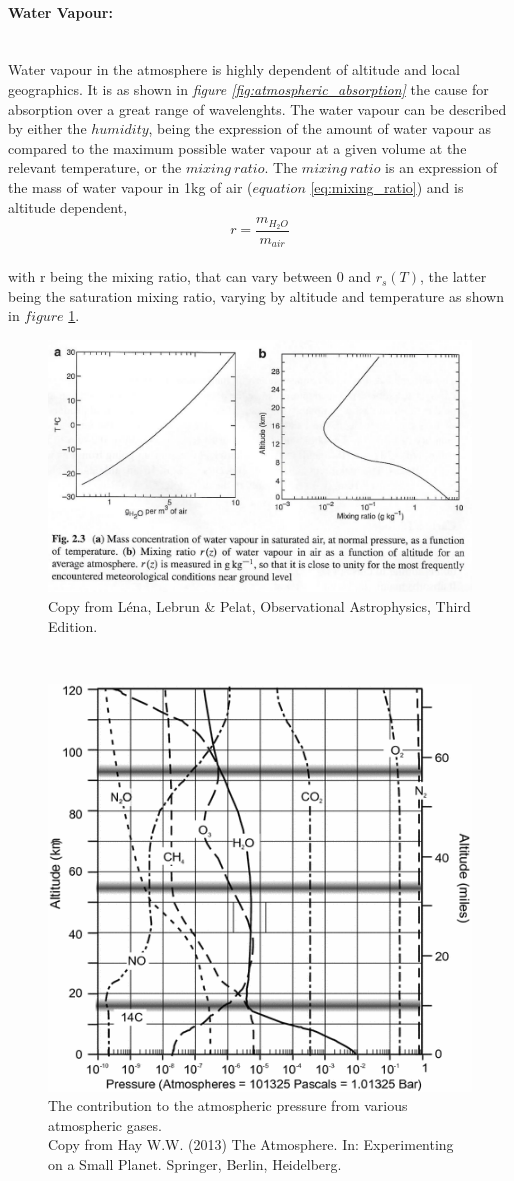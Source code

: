 \documentclass[a4paper, 12pt, twoside]{article}
\begin{document}
\paragraph[Water Vapour:]{Water Vapour:}\mbox{}\\
Water vapour in the atmosphere is highly dependent of altitude and local geographics. It is as shown in \emph{figure \ref{fig:atmospheric_absorption}} the cause for absorption over a great range of wavelenghts. The water vapour can be described by either the $humidity$, being the expression of the amount of water vapour as compared to the maximum possible water vapour at a given volume at the relevant temperature, or the $mixing\ ratio$. The $mixing\ ratio$ is an expression of the mass of water vapour in 1kg of air ($equation$ \ref{eq:mixing_ratio}) and is altitude dependent, 
\begin{equation}
r = \frac{m_{H_{2}O}}{m_{air}}
\label{eq:mixing_ratio}
\end{equation}\\
with r being the mixing ratio, that can vary between 0 and $r_{s}(T)$, the latter being the saturation mixing ratio, varying by altitude and temperature as shown in $figure$ \ref{fig:mixing_saturation_ratio}.
\begin{figure}[t!]
\center
\includegraphics[width=1.\linewidth]{Figure/water_vapour.png}
\caption{Copy from Léna, Lebrun \& Pelat\cite{LenaLebrunPelat}, Observational Astrophysics, Third Edition.}
\label{fig:mixing_saturation_ratio}
\end{figure}\\
\begin{figure}[t!]
\center
\includegraphics[width=.4\linewidth]{Figure/atmospheric_gases.png}
\caption{The contribution to the atmospheric pressure from various atmospheric gases. \\Copy from Hay W.W. (2013) The Atmosphere. In: Experimenting on a Small Planet. Springer, Berlin, Heidelberg.}
\label{fig:atmospheric_gases}
\end{figure}\\
\end{document}
